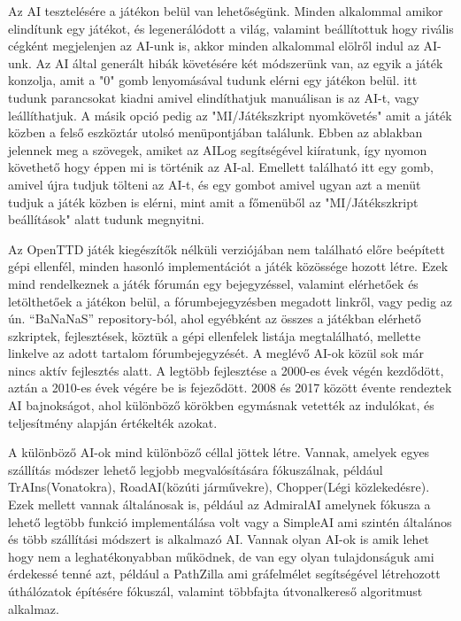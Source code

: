 Az AI tesztelésére a játékon belül van lehetőségünk. Minden alkalommal amikor elindítunk egy játékot, és legenerálódott a világ, valamint beállítottuk hogy rivális cégként megjelenjen az AI-unk is, akkor minden alkalommal elölről indul az AI-unk. Az AI által generált hibák követésére két módszerünk van, az egyik a játék konzolja, amit a "0" gomb lenyomásával tudunk elérni egy játékon belül. itt tudunk parancsokat kiadni amivel elindíthatjuk manuálisan is az AI-t, vagy leállíthatjuk. A másik opció pedig az "MI/Játékszkript nyomkövetés" amit a játék közben a felső eszköztár utolsó menüpontjában találunk. Ebben az ablakban jelennek meg a szövegek, amiket az AILog segítségével kiíratunk, így nyomon követhető hogy éppen mi is történik az AI-al. Emellett található itt egy gomb, amivel újra tudjuk tölteni az AI-t, és egy gombot amivel ugyan azt a menüt tudjuk a játék közben is elérni, mint amit a főmenüből az "MI/Játékszkript beállítások" alatt tudunk megnyitni.


Az OpenTTD játék kiegészítők nélküli verziójában nem található előre beépített gépi ellenfél, minden hasonló implementációt a játék közössége hozott létre. Ezek mind rendelkeznek a játék fórumán egy bejegyzéssel, valamint elérhetőek és letölthetőek a játékon belül, a fórumbejegyzésben megadott linkről, vagy pedig az ún. “BaNaNaS” repository-ból, ahol egyébként az összes a játékban elérhető szkriptek, fejlesztések, köztük a gépi ellenfelek listája megtalálható, mellette linkelve az adott tartalom fórumbejegyzését. A meglévő AI-ok közül sok már nincs aktív fejlesztés alatt. A legtöbb fejlesztése a 2000-es évek végén kezdődött, aztán a 2010-es évek végére be is fejeződött. 2008 és 2017 között évente rendeztek AI bajnokságot, ahol különböző körökben egymásnak vetették az indulókat, és teljesítmény alapján értékelték azokat.

A különböző AI-ok mind különböző céllal jöttek létre. Vannak, amelyek egyes szállítás módszer lehető legjobb megvalósítására fókuszálnak, például TrAIns(Vonatokra), RoadAI(közúti járművekre), Chopper(Légi közlekedésre). Ezek mellett vannak általánosak is, például az AdmiralAI amelynek fókusza a lehető legtöbb funkció implementálása volt vagy a SimpleAI ami szintén általános és több szállítási módszert is alkalmazó AI. Vannak olyan AI-ok is amik lehet hogy nem a leghatékonyabban működnek, de van egy olyan tulajdonságuk ami érdekessé tenné azt, például a PathZilla ami gráfelmélet segítségével létrehozott úthálózatok építésére fókuszál, valamint többfajta útvonalkereső algoritmust alkalmaz.

